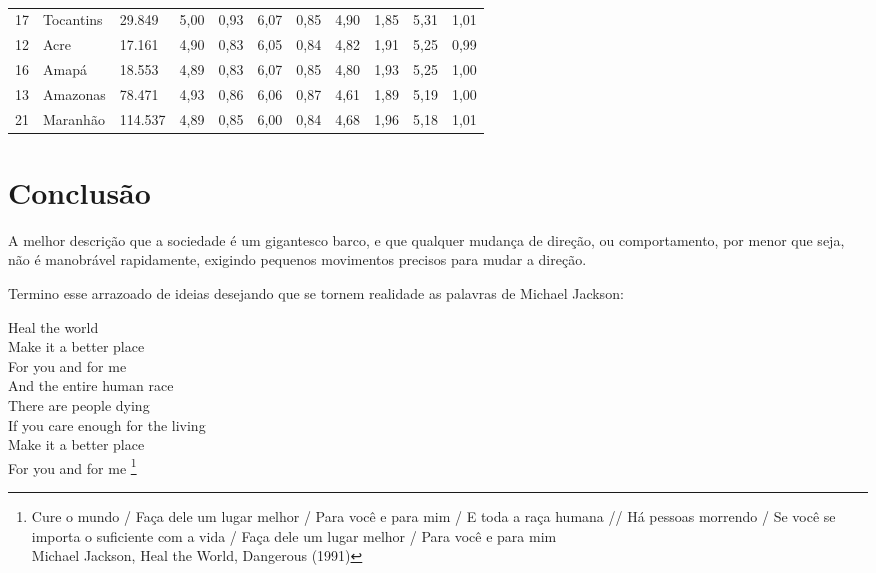 \begin{table}[]
\begin{tabular}{lllllllllll}
        17 & Tocantins           & 29.849  & 5,00 & 0,93 & 6,07 & 0,85 & 4,90 & 1,85 & 5,31 & 1,01 \\
        \rowcolor[HTML]{DCE6F1}
        12 & Acre                & 17.161  & 4,90 & 0,83 & 6,05 & 0,84 & 4,82 & 1,91 & 5,25 & 0,99 \\
        16 & Amapá               & 18.553  & 4,89 & 0,83 & 6,07 & 0,85 & 4,80 & 1,93 & 5,25 & 1,00 \\
        \rowcolor[HTML]{DCE6F1}
        13 & Amazonas            & 78.471  & 4,93 & 0,86 & 6,06 & 0,87 & 4,61 & 1,89 & 5,19 & 1,00 \\
        21 & Maranhão            & 114.537 & 4,89 & 0,85 & 6,00 & 0,84 & 4,68 & 1,96 & 5,18 & 1,01
    \end{tabular}
    \caption{}
    \label{table:IDH}
\end{table}



\section{Conclusão}

A melhor descrição que a sociedade é um gigantesco barco, e que qualquer mudança de direção, ou comportamento, por menor que seja, não é manobrável rapidamente, exigindo pequenos movimentos precisos para mudar a direção.


Termino esse arrazoado de ideias desejando que se tornem realidade as palavras de Michael Jackson:

\begin{citacao}
    Heal the world\\
    Make it a better place\\
    For you and for me\\
    And the entire human race\\

    There are people dying\\
    If you care enough for the living\\
    Make it a better place\\
    For you and for me \footnote{
        Cure o mundo / Faça dele um lugar melhor / Para você e para mim / E toda a raça humana //
        Há pessoas morrendo / Se você se importa o suficiente com a vida / Faça dele um lugar melhor / Para você e para mim \\
        Michael Jackson, Heal the World, Dangerous (1991)
    }
\end{citacao}
